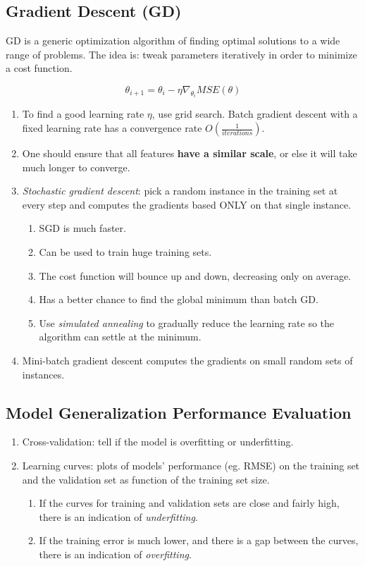 \documentclass[12pt,oneside,a4paper]{article}
\numberwithin{equation}{section}
\begin{document}
\subsection{Gradient Descent (GD)}
GD is a generic optimization algorithm of finding optimal solutions to a wide range of problems. The idea is: tweak parameters iteratively in order to minimize a cost function.

\begin{equation}
\theta_{i+1} = \theta_i - \eta \nabla_{\theta_i} MSE(\theta)
\end{equation}
\begin{enumerate}
\item  To find a good learning rate $\eta$, use grid search. Batch gradient descent with a fixed learning rate has a convergence rate $O(\frac{1}{iterations})$.

\item One should ensure that all features \textbf{have a similar scale}, or else it will take much longer to converge.

\item \emph{Stochastic gradient descent}: pick a random instance in the training set at every step and computes the gradients based ONLY on that single instance. 

\begin{enumerate}
\item SGD is much faster. 
\item Can be used to train huge training sets. 
\item The cost function will bounce up and down, decreasing only on average. 
\item Has a better chance to find the global minimum than batch GD.
\item Use \emph{simulated annealing} to gradually reduce the learning rate so the algorithm can settle at the minimum.
\end{enumerate}

\item Mini-batch gradient descent computes the gradients on small random sets of instances.
\end{enumerate}

\subsection{Model Generalization Performance Evaluation}
\begin{enumerate}
\item Cross-validation: tell if the model is overfitting or underfitting.
\item Learning curves: plots of models' performance (eg. RMSE) on the training set and the validation set as function of the training set size.
\begin{enumerate}
\item If the curves for training and validation sets are close and fairly high, there is an indication of \emph{underfitting}.
\item If the training error is much lower, and there is a gap between the curves, there is an indication of \emph{overfitting}.
\end{enumerate}
\end{enumerate}
\end{document}

